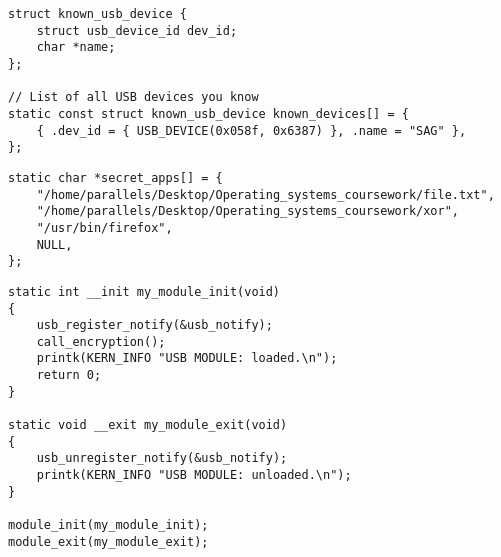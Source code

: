   \begin{lstlisting}[caption = Конфигурационный файл USB устройств, label =  lst:config_usb]
 struct known_usb_device {
    struct usb_device_id dev_id;
    char *name;
};

// List of all USB devices you know
static const struct known_usb_device known_devices[] = {
    { .dev_id = { USB_DEVICE(0x058f, 0x6387) }, .name = "SAG" },
};
  \end{lstlisting}

   \begin{lstlisting}[caption = Конфигурационный файл секретных файлов и приложений, label =  lst:config_file]  
  static char *secret_apps[] = {
    "/home/parallels/Desktop/Operating_systems_coursework/file.txt",
    "/home/parallels/Desktop/Operating_systems_coursework/xor",
    "/usr/bin/firefox",
	NULL,
};
    \end{lstlisting}
 
   \begin{lstlisting}[caption = Загрузка и удаление модуля ядра, label =  lst:module]
static int __init my_module_init(void)
{
    usb_register_notify(&usb_notify);
    call_encryption();
    printk(KERN_INFO "USB MODULE: loaded.\n");
    return 0;
}

static void __exit my_module_exit(void)
{
    usb_unregister_notify(&usb_notify);    
    printk(KERN_INFO "USB MODULE: unloaded.\n");
}

module_init(my_module_init);
module_exit(my_module_exit);
 \end{lstlisting}
 
